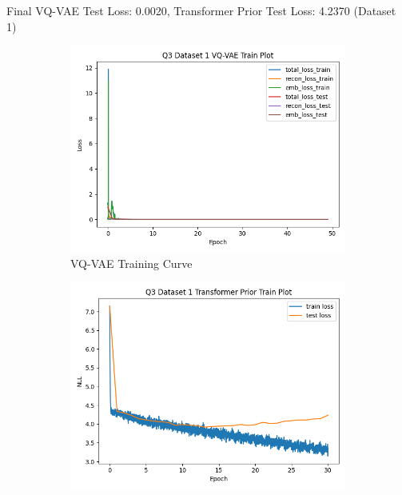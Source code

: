 \documentclass{article}
\begin{document}
\newpage
{}

Final VQ-VAE Test Loss: 0.0020, Transformer Prior Test Loss: 4.2370 (Dataset 1)
\begin{figure}[H]
       \centering
       \begin{subfigure}[b]{0.475\textwidth}
           \centering
           \includegraphics[width=\textwidth]{figures/q3_dset1_vqvae_train_plot.png}
           \caption{VQ-VAE Training Curve}
       \end{subfigure}
       \hfill
       \begin{subfigure}[b]{0.475\textwidth}
           \centering
           \includegraphics[width=\textwidth]{figures/q3_dset1_prior_train_plot.png}

\end{subfigure}
\end{figure}
\end{document}
